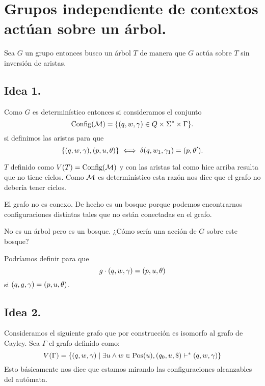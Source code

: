 \documentclass[12pt]{article}
\begin{document}
	





\section{Grupos independiente de contextos actúan sobre un árbol.}

Sea $G$ un grupo \ic{} entonces busco un árbol $T$ de manera que $G$ actúa sobre $T$ sin inversión de aristas.

\subsection{Idea 1.}
Como $G$ es determinístico \ic{} entonces si consideramos el conjunto 
\[
	\text{Config}({\cal M}) = \{ (q, w, \gamma) \in Q \times \Sigma^* \times \Gamma \}.
\]
si definimos las aristas para que 
\[
	\{ (q, w, \gamma), (p,u,\theta)  \} \iff \delta(q,w_{1},\gamma_{1}) = (p, \theta').
\]

\begin{afirmacion}
	$T$ definido como $V(T) = \text{Config}({\cal M})$ y con las aristas tal como hice arriba resulta que no tiene ciclos.
	Como $\cal M$ es determinístico esta razón nos dice que el grafo no debería tener ciclos. 
\end{afirmacion}


\begin{afirmacion}
	El grafo no es conexo.
	De hecho es un bosque porque podemos encontrarnos configuraciones distintas tales que no están conectadas en el grafo.
\end{afirmacion}

No es un árbol pero es un bosque.
¿Cómo sería una acción de $G$ sobre este bosque?

\begin{afirmacion}
	Podríamos definir para que 
	\[
		g \cdot (q, w, \gamma) = (p,u,\theta)
	\]
	si $(q,g,\gamma) = (p,u,\theta)$.
	
\end{afirmacion}

\subsection{Idea 2.}
	Consideramos el siguiente grafo que por construcción es isomorfo al grafo de Cayley.
	Sea $\Gamma$ el grafo definido como:
	\begin{equation}
		V(\Gamma) = \{ (q, w, \gamma) \mid \exists u \land w \in \text{Pos}(u), (q_{0},u,\$) \vdash^{*} (q, w, \gamma) \} 
	\end{equation}
	Esto básicamente nos dice que estamos mirando las configuraciones alcanzables del autómata.
	
\end{document}
